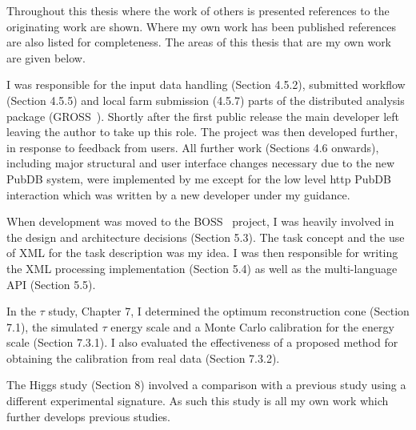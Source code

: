 		
Throughout this thesis where the work of others is presented references to the originating work are shown. Where my own work has been published references are also listed for completeness. The areas of this thesis that are my own work are given below.

						
I was responsible for the input data handling (Section 4.5.2), submitted workflow (Section 4.5.5) and local farm submission (4.5.7) parts of the distributed analysis package (GROSS~\cite{CHEP04_TALLINI}). Shortly after the first public release the main developer left leaving the author to take up this role. The project was then developed further, in response to feedback from users. All further work (Sections 4.6 onwards), including major structural and user interface changes necessary due to the new PubDB system, were implemented by me except for the low level http PubDB interaction which was written by a new developer under my guidance. 

When development was moved to the BOSS~\cite{citeulike:880984} project, I was heavily involved in the design and architecture decisions (Section 5.3). The task concept and the use of XML for the task description was my idea. I was then responsible for writing the XML processing implementation (Section 5.4) as well as the multi-language API (Section 5.5).

In the $\tau$ study, Chapter 7, I determined the optimum reconstruction cone (Section 7.1), the simulated $\tau$ energy scale and a Monte Carlo calibration for the energy scale (Section 7.3.1). I also evaluated the effectiveness of a proposed method for obtaining the calibration from real data (Section 7.3.2).

The Higgs study (Section 8) involved a comparison with a previous study using a different experimental signature. As such this study is all my own work which further develops previous studies.